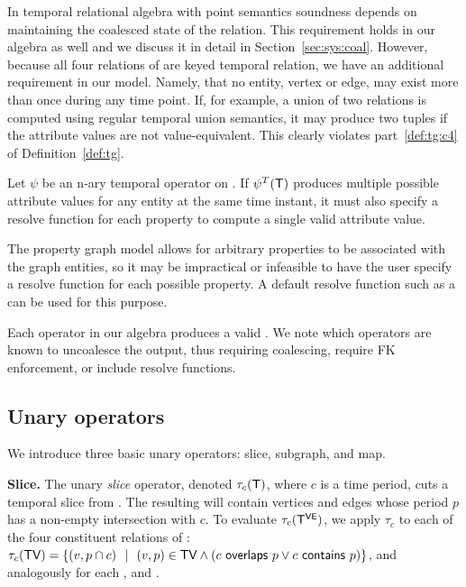 In temporal relational algebra with point semantics soundness depends
on maintaining the coalesced state of the relation.  This requirement
holds in our algebra as well and we discuss it in detail in
Section~\ref{sec:sys:coal}.  However, because all four relations of
\tve are keyed temporal relation, we have an additional requirement in
our model.  Namely, that no entity, vertex or edge, may exist more than
once during any time point.  If, for example, a union of two \tav
relations is computed using regular temporal union semantics, it may
produce two tuples if the attribute values are not value-equivalent.
This clearly violates part~\ref{def:tg:c4} of Definition~\ref{def:tg}.

\begin{lemma}
Let $\psi$ be an n-ary temporal operator on \tg.  If $\psi^T (\mathsf{T})$
produces multiple possible attribute values for any entity at the same
time instant, it must also specify a resolve function for each
property to compute a single valid attribute value.
\end{lemma}

The property graph model allows for arbitrary properties to be
associated with the graph entities, so it may be impractical or
infeasible to have the user specify a resolve function for each
possible property.  A default resolve function such as a 
can be used for this purpose.


Each operator in our algebra produces a valid \tg.  We note which
operators are known to uncoalesce the output, thus requiring
coalescing, require FK enforcement, or include resolve functions.

\subsection{Unary operators}
\label{sec:algebra:unary}

We introduce three basic unary operators: slice, subgraph, and map.

{\bf Slice.}  The unary {\em slice} operator, denoted $\tau_c (\mathsf{T})$,
where $c$ is a time period, cuts a temporal slice from \ttt.  The
resulting \tg will contain vertices and edges whose period $p$ has a
non-empty intersection with $c$.  To evaluate $\tau_c (\mathsf{T^{VE}})$, we
apply $\tau_c$ to each of the four constituent relations of \tve:
$\tau_c (\textsf{TV}) = \{ (v, p \cap c)~~|~~(v, p) \in \textsf{TV} \wedge
(c~\mathsf{overlaps}~p \vee c~\mathsf{contains}~p) \}$, and
analogously for each \te, \tav and \tae.

